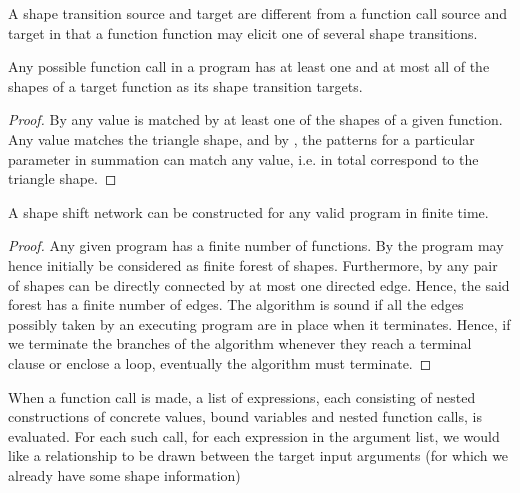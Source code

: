 \begin{definition} A shape transition source and target are different from a
function call source and target in that a function function may elicit one of
several shape transitions.\end{definition}

\begin{lemma}\label{lemma:extend-any-call-targets} Any possible function call in a program has at least one and at
most all of the shapes of a target function as its shape transition
targets.\end{lemma}

\begin{proof} By  any value is
matched by at least one of the shapes of a given function. Any value matches
the triangle shape, and by , the
patterns for a particular parameter in summation can match any value, i.e. in
total correspond to the triangle shape.\end{proof}

\begin{theorem} A shape shift network can be constructed for any valid program
in finite time.\end{theorem}

\begin{proof} Any given program has a finite number of functions. By
 the program may hence initially be
considered as finite forest of shapes. Furthermore, by
 any pair of shapes can be directly
connected by at most one directed edge. Hence, the said forest has a finite
number of edges. The algorithm is sound if all the edges possibly taken by an
executing program are in place when it terminates.  Hence, if we terminate the
branches of the algorithm whenever they reach a terminal clause or enclose a
loop, eventually the algorithm must terminate.\end{proof}


When a function call is made, a list of expressions, each consisting of nested
constructions of concrete values, bound variables and nested function calls, is
evaluated. For each such call, for each expression in the argument list, we
would like a relationship to be drawn between the target input arguments (for
which we already have some shape information) 






